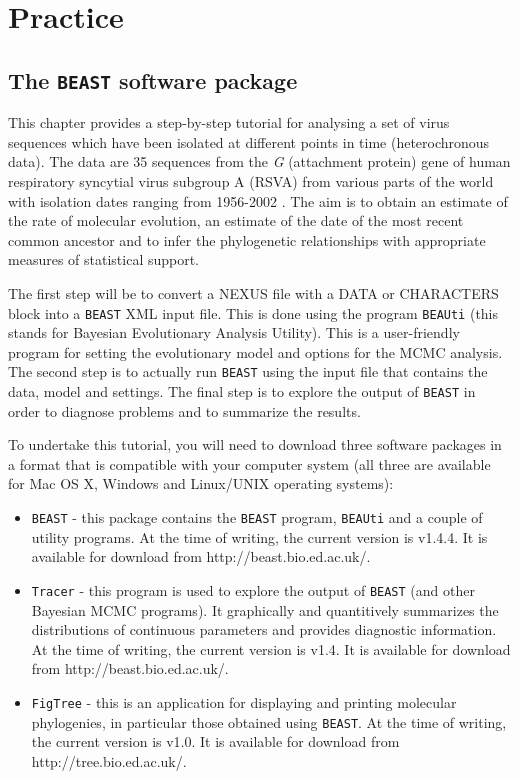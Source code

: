 \documentclass[cup7b, english]{cupbook}
\begin{document}
\section{Practice}

\subsection{The \texttt{BEAST} software package}

This chapter provides a step-by-step tutorial for analysing a set of virus sequences which have been isolated
at different points in time (heterochronous data). The data are 35 sequences from the {\it G} (attachment protein) gene 
of human respiratory syncytial virus subgroup A (RSVA) from various parts of the world with isolation dates ranging from 1956-2002 
\cite{Zlateva2004}. The aim is to obtain an estimate of the rate of molecular evolution, an estimate of the date of 
the most recent common ancestor and to infer the phylogenetic relationships with appropriate measures of statistical support.

The first step will be to convert a NEXUS file with a DATA or CHARACTERS block into a \texttt{BEAST} XML input file.
This is done using the program \texttt{BEAUti} (this stands for Bayesian Evolutionary Analysis Utility). This is a
user-friendly program for setting the evolutionary model and options for the MCMC analysis. The second step
is to actually run \texttt{BEAST} using the input file that contains the data, model and settings. The final step is to
explore the output of \texttt{BEAST} in order to diagnose problems and to summarize the results.

To undertake this tutorial, you will need to download three software packages in a format that is compatible
with your computer system (all three are available for Mac OS X, Windows and Linux/UNIX operating systems):

\begin{itemize}
\item \texttt{BEAST} - this package contains the \texttt{BEAST} program, \texttt{BEAUti} and a couple of utility programs. At the time of writing,
the current version is v1.4.4. It is available for download from http://beast.bio.ed.ac.uk/.
\item \texttt{Tracer} - this program is used to explore the output of \texttt{BEAST} (and other Bayesian MCMC programs). It
graphically and quantitively summarizes the distributions of continuous parameters and provides diagnostic
information. At the time of writing, the current version is v1.4. It is available for download from http://beast.bio.ed.ac.uk/.
\item \texttt{FigTree} - this is an application for displaying and printing molecular phylogenies, in particular
those obtained using \texttt{BEAST}. At the time of writing, the current version is v1.0. It is available for download
from http://tree.bio.ed.ac.uk/.
\end{itemize}
\end{document}
